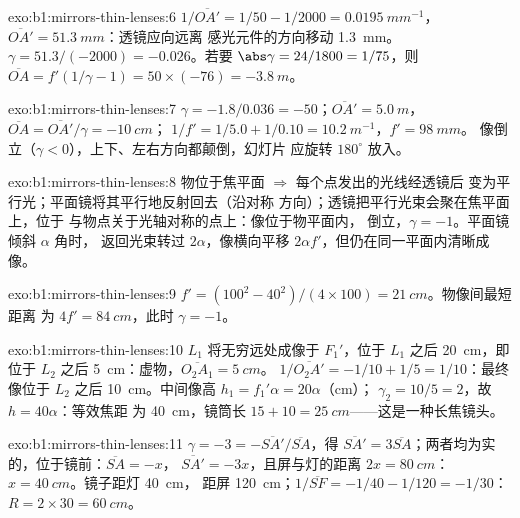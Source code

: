 \begin{solution}{exo:b1:mirrors-thin-lenses:6}
$1/\overline{OA'} = 1/50 - 1/2000 = \qty{0.0195}{mm^{-1}}$，
$\overline{OA'} = \qty{51.3}{mm}$：透镜应向远离
感光元件的方向移动 \qty{1.3}{mm}。$\gamma = 51.3/(-2000) = -0.026$。若要 $\abs\gamma = 24/1800
= 1/75$，则 $\overline{OA} = f'(1/\gamma - 1) = 50 \times (-76) =
\qty{-3.8}{m}$。
\end{solution}

\begin{solution}{exo:b1:mirrors-thin-lenses:7}
$\gamma = -1.8/0.036 = -50$；$\overline{OA'} = \qty{5.0}{m}$，
$\overline{OA} = \overline{OA'}/\gamma = \qty{-10}{cm}$；
$1/f' = 1/5.0 + 1/0.10 = \qty{10.2}{m^{-1}}$，$f' = \qty{98}{mm}$。
像倒立（$\gamma < 0$），上下、左右方向都颠倒，幻灯片
应旋转 $180^\circ$ 放入。
\end{solution}

\begin{solution}{exo:b1:mirrors-thin-lenses:8}
物位于焦平面 $\Rightarrow$ 每个点发出的光线经透镜后
变为平行光；平面镜将其平行地反射回去（沿对称
方向）；透镜把平行光束会聚在焦平面上，位于
与物点关于光轴对称的点上：像位于物平面内，
倒立，$\gamma = -1$。平面镜倾斜 $\alpha$ 角时，
返回光束转过 $2\alpha$，像横向平移
$2\alpha f'$，但仍在同一平面内清晰成像。
\end{solution}

\begin{solution}{exo:b1:mirrors-thin-lenses:9}
$f' = (100^2 - 40^2)/(4 \times 100) = \qty{21}{cm}$。物像间最短距离
为 $4f' = \qty{84}{cm}$，此时 $\gamma = -1$。
\end{solution}

\begin{solution}{exo:b1:mirrors-thin-lenses:10}
$L_1$ 将无穷远处成像于 $F_1'$，位于 $L_1$ 之后 \qty{20}{cm}，即
位于 $L_2$ 之后 \qty{5}{cm}：虚物，$\overline{O_2A_1} = \qty{+5}{cm}$。
$1/\overline{O_2A'} = -1/10 + 1/5 = 1/10$：最终像位于
$L_2$ 之后 \qty{10}{cm}。中间像高 $h_1 = f_1'\alpha = 20\alpha$（cm）；
$\gamma_2 = 10/5 = 2$，故 $h = 40\alpha$：等效焦距
为 \qty{40}{cm}，镜筒长 $15 + 10 = \qty{25}{cm}$——这是一种长焦镜头。
\end{solution}

\begin{solution}{exo:b1:mirrors-thin-lenses:11}
$\gamma = -3 = -\overline{SA'}/\overline{SA}$，得 $\overline{SA'} =
3\overline{SA}$；两者均为实的，位于镜前：$\overline{SA} = -x$，
$\overline{SA'} = -3x$，且屏与灯的距离 $2x = \qty{80}{cm}$：
$x = \qty{40}{cm}$。镜子距灯 \qty{40}{cm}，
距屏 \qty{120}{cm}；$1/\overline{SF} = -1/40 - 1/120 = -1/30$：
$R = 2 \times 30 = \qty{60}{cm}$。
\end{solution}


